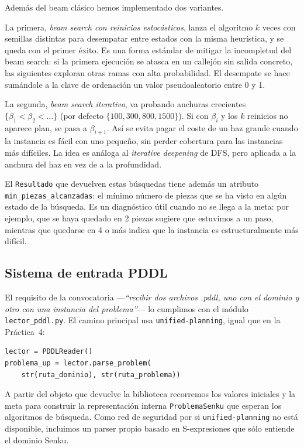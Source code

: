 \documentclass[conference,a4paper]{IEEEtran}
\begin{document}
Además del beam clásico hemos implementado dos variantes.

La primera, \emph{beam search con reinicios estocásticos}, lanza el
algoritmo $k$ veces con semillas distintas para desempatar entre estados
con la misma heurística, y se queda con el primer éxito. Es una forma
estándar de mitigar la incompletud del beam search: si la primera
ejecución se atasca en un callejón sin salida concreto, las siguientes
exploran otras ramas con alta probabilidad. El desempate se hace
sumándole a la clave de ordenación un valor pseudoaleatorio entre 0 y 1.

La segunda, \emph{beam search iterativo}, va probando anchuras
crecientes $\{\beta_1 < \beta_2 < \dots\}$ (por defecto $\{100, 300,
800, 1500\}$). Si con $\beta_i$ y los $k$ reinicios no aparece plan, se
pasa a $\beta_{i+1}$. Así se evita pagar el coste de un haz grande
cuando la instancia es fácil con uno pequeño, sin perder cobertura para
las instancias más difíciles. La idea es análoga al \emph{iterative
deepening} de DFS, pero aplicada a la anchura del haz en vez de a la
profundidad.

El \texttt{Resultado} que devuelven estas búsquedas tiene además un
atributo \texttt{min\_piezas\_alcanzadas}: el mínimo número de piezas
que se ha visto en algún estado de la búsqueda. Es un diagnóstico
útil cuando no se llega a la meta: por ejemplo, que se haya quedado en
2 piezas sugiere que estuvimos a un paso, mientras que quedarse en 4 o
más indica que la instancia es estructuralmente más difícil.


\subsection{Sistema de entrada PDDL}

El requisito de la convocatoria ---\textit{``recibir dos archivos .pddl,
uno con el dominio y otro con una instancia del problema''}--- lo
cumplimos con el módulo \texttt{lector\_pddl.py}. El camino principal usa
\texttt{unified-planning}, igual que en la Práctica~4:

\begin{verbatim}
lector = PDDLReader()
problema_up = lector.parse_problem(
    str(ruta_dominio), str(ruta_problema))
\end{verbatim}

A partir del objeto que devuelve la biblioteca recorremos los valores
iniciales y la meta para construir la representación interna
\texttt{ProblemaSenku} que esperan los algoritmos de búsqueda. Como red
de seguridad por si \texttt{unified-planning} no está disponible,
incluimos un parser propio basado en S-expresiones que sólo entiende el
dominio Senku.
\end{document}
